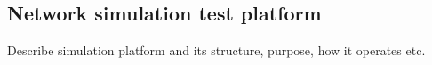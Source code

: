 \subsection{Network simulation test platform}
\label{sec:simulation_platform}

Describe simulation platform and its structure, purpose, how it operates etc.

